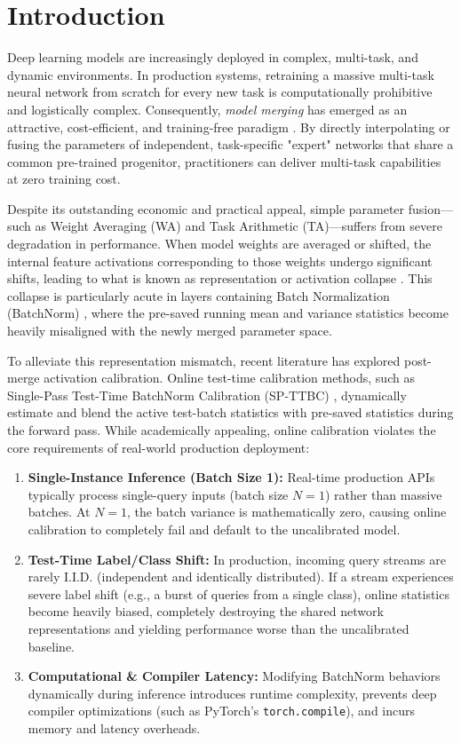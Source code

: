 \documentclass{article}
\theoremstyle{plain}
\theoremstyle{definition}
\theoremstyle{remark}
\begin{document}
\section{Introduction}
\label{sec:intro}

Deep learning models are increasingly deployed in complex, multi-task, and dynamic environments. In production systems, retraining a massive multi-task neural network from scratch for every new task is computationally prohibitive and logistically complex. Consequently, \emph{model merging} has emerged as an attractive, cost-efficient, and training-free paradigm \cite{weight_averaging, task_arithmetic}. By directly interpolating or fusing the parameters of independent, task-specific "expert" networks that share a common pre-trained progenitor, practitioners can deliver multi-task capabilities at zero training cost.

Despite its outstanding economic and practical appeal, simple parameter fusion—such as Weight Averaging (WA) and Task Arithmetic (TA)—suffers from severe degradation in performance. When model weights are averaged or shifted, the internal feature activations corresponding to those weights undergo significant shifts, leading to what is known as representation or activation collapse \cite{repair}. This collapse is particularly acute in layers containing Batch Normalization (BatchNorm) \cite{resnet}, where the pre-saved running mean and variance statistics become heavily misaligned with the newly merged parameter space.

To alleviate this representation mismatch, recent literature has explored post-merge activation calibration. Online test-time calibration methods, such as Single-Pass Test-Time BatchNorm Calibration (SP-TTBC) \cite{spttbc}, dynamically estimate and blend the active test-batch statistics with pre-saved statistics during the forward pass. While academically appealing, online calibration violates the core requirements of real-world production deployment:
\begin{enumerate}
    \item \textbf{Single-Instance Inference (Batch Size 1):} Real-time production APIs typically process single-query inputs (batch size $N=1$) rather than massive batches. At $N=1$, the batch variance is mathematically zero, causing online calibration to completely fail and default to the uncalibrated model.
    \item \textbf{Test-Time Label/Class Shift:} In production, incoming query streams are rarely I.I.D. (independent and identically distributed). If a stream experiences severe label shift (e.g., a burst of queries from a single class), online statistics become heavily biased, completely destroying the shared network representations and yielding performance worse than the uncalibrated baseline.
    \item \textbf{Computational \& Compiler Latency:} Modifying BatchNorm behaviors dynamically during inference introduces runtime complexity, prevents deep compiler optimizations (such as PyTorch's \texttt{torch.compile}), and incurs memory and latency overheads.
\end{enumerate}
\end{document}
